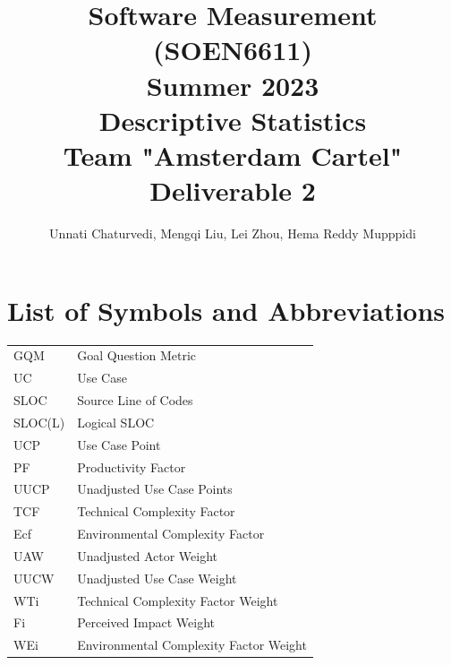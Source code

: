 \documentclass[12pt,letterpaper]{report}
\begin{document}
\title{Software Measurement (SOEN6611)\\[.5em]
Summer 2023\\[.5em]
Descriptive Statistics\\[.5em]
Team "Amsterdam Cartel"\\[.5em]
Deliverable 2}
\author{Unnati Chaturvedi, Mengqi Liu, Lei Zhou, Hema Reddy Mupppidi}
\maketitle

\setcounter{page}{0}

\tableofcontents

\chapter*{List of Symbols and Abbreviations}



\noindent\begin{tabular}{ll}
GQM & Goal Question Metric\\
UC & Use Case\\
SLOC & Source Line of Codes\\
SLOC(L) & Logical SLOC\\
UCP & Use Case Point\\
PF & Productivity Factor\\
UUCP & Unadjusted Use Case Points\\
TCF & Technical Complexity Factor\\
Ecf & Environmental Complexity Factor\\
UAW & Unadjusted Actor Weight\\
UUCW & Unadjusted Use Case Weight\\
WTi & Technical Complexity Factor Weight\\
Fi & Perceived Impact Weight\\
WEi & Environmental Complexity Factor Weight


\end{tabular}

\listoffigures{}
\end{document}
